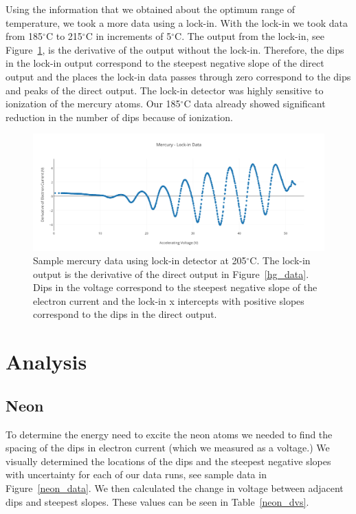 \documentclass[prb,preprint]{revtex4-1}
\begin{document}
Using the information that we obtained about the optimum range of temperature, we took a more data using a lock-in. With the lock-in we took data from 185$^{\circ}$C to 215$^{\circ}$C in increments of 5$^{\circ}$C. The output from the lock-in, see Figure~\ref{hg_lockin}, is the derivative of the output without the lock-in. Therefore, the dips in the lock-in output correspond to the steepest negative slope of the direct output and the places the lock-in data passes through zero correspond to the dips and peaks of the direct output. The lock-in detector was highly sensitive to ionization of the mercury atoms. Our 185$^{\circ}$C data already showed significant reduction in the number of dips because of ionization.

\begin{figure}[h!]
\centering

\includegraphics[width=6in]{hg_lockin.pdf}
\caption{Sample mercury data using lock-in detector at 205$^{\circ}$C. The lock-in output is the derivative of the direct output in Figure~\ref{hg_data}. Dips in the voltage correspond to the steepest negative slope of the electron current and the lock-in x intercepts with positive slopes correspond to the dips in the direct output.}

\label{hg_lockin}
\end{figure}



\section{Analysis}

\subsection{Neon}

To determine the energy need to excite the neon atoms we needed to find the spacing of the dips in electron current (which we measured as a voltage.) We visually determined the locations of the dips and the steepest negative slopes with uncertainty for each of our data runs, see sample data in Figure~\ref{neon_data}. We then calculated the change in voltage between adjacent dips and steepest slopes. These values can be seen in Table~\ref{neon_dvs}.
\end{document}
